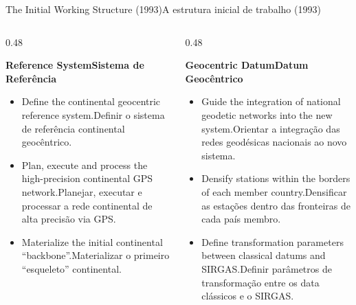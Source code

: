 \documentclass[aspectratio=169,11pt]{beamer}
\newcommand{\tr}[2]{\ifEN#2\else#1\fi}
\begin{document}
\begin{frame}{\tr{A estrutura inicial de trabalho (1993)}{The Initial Working Structure (1993)}}
  \begin{columns}[onlytextwidth]
    \begin{column}{0.48\textwidth}
      \begin{tcolorbox}[colback=mTeal!8, colframe=mTeal, title={\tr{Grupo de Trabalho I (GT I)}{Working Group I (WG I)}}]
        \scriptsize
        \textbf{\tr{Sistema de Referência}{Reference System}}\\[3pt]
        \begin{itemize}
          \setlength{\itemsep}{2pt}
          \item \tr{Definir o sistema de referência continental geocêntrico.}{Define the continental geocentric reference system.}
          \item \tr{Planejar, executar e processar a rede continental de alta precisão via GPS.}{Plan, execute and process the high-precision continental GPS network.}
          \item \tr{Materializar o primeiro ``esqueleto'' continental.}{Materialize the initial continental ``backbone''.}
        \end{itemize}
      \end{tcolorbox}
    \end{column}
    \begin{column}{0.48\textwidth}
      \begin{tcolorbox}[colback=mIndigo!8, colframe=mIndigo, title={\tr{Grupo de Trabalho II (GT II)}{Working Group II (WG II)}}]
        \scriptsize
        \textbf{\tr{Datum Geocêntrico}{Geocentric Datum}}\\[3pt]
        \begin{itemize}
          \setlength{\itemsep}{2pt}
          \item \tr{Orientar a integração das redes geodésicas nacionais ao novo sistema.}{Guide the integration of national geodetic networks into the new system.}
          \item \tr{Densificar as estações dentro das fronteiras de cada país membro.}{Densify stations within the borders of each member country.}
          \item \tr{Definir parâmetros de transformação entre os data clássicos e o SIRGAS.}{Define transformation parameters between classical datums and SIRGAS.}
        \end{itemize}
      \end{tcolorbox}
    \end{column}

\end{columns}
\end{frame}
\end{document}
